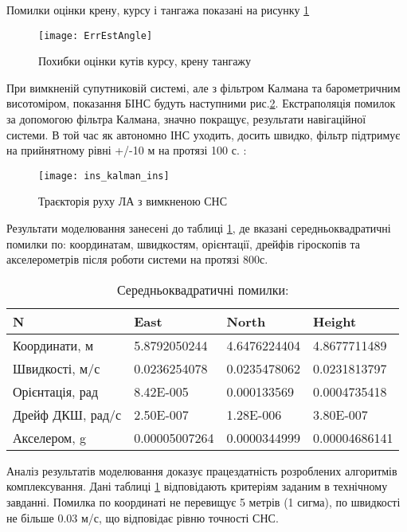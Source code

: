 Помилки оцінки крену, курсу і тангажа показані на рисунку \ref{fig:ErrEstAngle}

\begin{figure}[H]
\centering
\texttt{[image: ErrEstAngle]}
\caption{Похибки оцінки кутів курсу, крену тангажу}
\label{fig:ErrEstAngle}
\end{figure}

При вимкненій супутниковій системі, але з фільтром Калмана та барометричним висотоміром, показання БІНС будуть наступними рис.\ref{fig:ins_kalman_ins}. Екстраполяція помилок за допомогою фільтра Калмана, значно покращує, результати навігаційної системи. В той час як автономно ІНС уходить, досить швидко, фільтр підтримує на прийнятному рівні +/-10 м на протязі 100 с. :

\begin{figure}[H]
\centering
\texttt{[image: ins\_kalman\_ins]}
\caption{Траєкторія руху ЛА з вимкненою СНС}
\label{fig:ins_kalman_ins}
\end{figure}

Результати моделювання занесені до таблиці \ref{tab:results}, де вказані середньоквадратичні помилки по: координатам, швидкостям, орієнтації, дрейфів гіроскопів та акселерометрів після роботи системи на протязі 800с.

\begin{table}[H]
\centering
\caption{Середньоквадратичні помилки: }
\begin{tabular}{|p{50mm}|p{30mm}|p{30mm}|p{30mm}|} \hline
N&East&North&Height \\ \hline
Координати, м & 5.8792050244& 4.6476224404& 4.8677711489 \\ \hline 
Швидкості, м/с& 0.0236254078& 0.0235478062& 0.0231813797 \\ \hline 
Орієнтація, рад& 8.42E-005& 0.000133569& 0.0004735418 \\ \hline 
Дрейф ДКШ, рад/с& 2.50E-007& 1.28E-006 & 3.80E-007 \\ \hline 
Акселером, g & 0.00005007264& 0.0000344999 & 0.00004686141 \\ \hline 
\end{tabular}
\label{tab:results}
\end{table}

Аналіз результатів моделювання доказує працездатність розроблених алгоритмів комплексування. Дані таблиці \ref{tab:results} відповідають критеріям заданим в технічному завданні. Помилка по координаті не перевищує 5 метрів (1 сигма), по швидкості не більше 0.03 м/с, що відповідає рівню точності СНС.